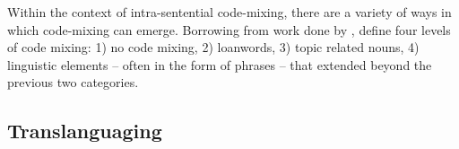Within the context of intra-sentential code-mixing, there are a variety of ways in which code-mixing can emerge. Borrowing from work done by \citet{berk-seligson_linguistic_1986}, \citet{yong_prompting_2023} define four levels of code mixing: 1) no code mixing, 2) loanwords, 3) topic related nouns, 4) linguistic elements -- often in the form of phrases -- that extended beyond the previous two categories.



\subsection{Translanguaging}





